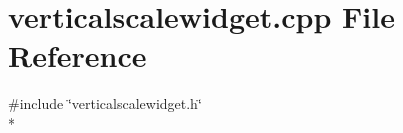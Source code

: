 \section{verticalscalewidget.\+cpp File Reference}
\label{bk3_2verticalscalewidget_8cpp}
{\ttfamily \#include \char`\"{}verticalscalewidget.\+h\char`\"{}}\\*
